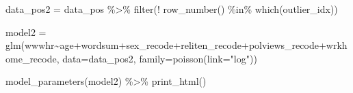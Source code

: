 \documentclass[
  letterpaper,
  DIV=11,
  numbers=noendperiod]{scrartcl}
\newenvironment{Shaded}{\begin{snugshade}}{\end{snugshade}}
\newcommand{\AttributeTok}[1]{\textcolor[rgb]{0.40,0.45,0.13}{#1}}
\newcommand{\FunctionTok}[1]{\textcolor[rgb]{0.28,0.35,0.67}{#1}}
\newcommand{\NormalTok}[1]{\textcolor[rgb]{0.00,0.23,0.31}{#1}}
\newcommand{\OtherTok}[1]{\textcolor[rgb]{0.00,0.23,0.31}{#1}}
\newcommand{\SpecialCharTok}[1]{\textcolor[rgb]{0.37,0.37,0.37}{#1}}
\newcommand{\StringTok}[1]{\textcolor[rgb]{0.13,0.47,0.30}{#1}}
\begin{document}
\begin{Shaded}
\begin{Highlighting}[]
\NormalTok{data\_pos2 }\OtherTok{=}\NormalTok{ data\_pos }\SpecialCharTok{\%\textgreater{}\%}
  \FunctionTok{filter}\NormalTok{(}\SpecialCharTok{!} \FunctionTok{row\_number}\NormalTok{() }\SpecialCharTok{\%in\%} \FunctionTok{which}\NormalTok{(outlier\_idx))}

\NormalTok{model2 }\OtherTok{=} \FunctionTok{glm}\NormalTok{(wwwhr}\SpecialCharTok{\textasciitilde{}}\NormalTok{age}\SpecialCharTok{+}\NormalTok{wordsum}\SpecialCharTok{+}\NormalTok{sex\_recode}\SpecialCharTok{+}\NormalTok{reliten\_recode}\SpecialCharTok{+}\NormalTok{polviews\_recode}\SpecialCharTok{+}\NormalTok{wrkhome\_recode, }
              \AttributeTok{data=}\NormalTok{data\_pos2,}
              \AttributeTok{family=}\FunctionTok{poisson}\NormalTok{(}\AttributeTok{link=}\StringTok{"log"}\NormalTok{))}
\end{Highlighting}
\end{Shaded}

\begin{Shaded}
\begin{Highlighting}[]
\FunctionTok{model\_parameters}\NormalTok{(model2) }\SpecialCharTok{\%\textgreater{}\%}
  \FunctionTok{print\_html}\NormalTok{()}
\end{Highlighting}
\end{Shaded}
\end{document}
